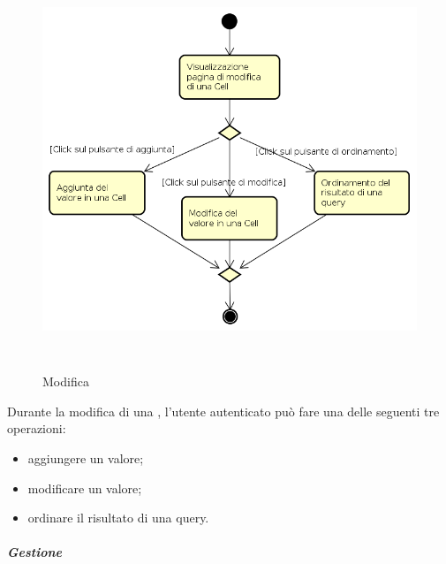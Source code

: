 \begin{figure}[H]
\begin{center}
\includegraphics[height=12cm]{res/sections/backend/activities/modificaCell.png}
\caption{Modifica }
\end{center}
\end{figure}
Durante la modifica di una , l'utente autenticato può fare una delle seguenti tre operazioni:
\begin{itemize}
\item aggiungere un valore;
\item modificare un valore;
\item ordinare il risultato di una query.
\end{itemize}
\newpage
\subparagraph{Gestione } \mbox{} \\

